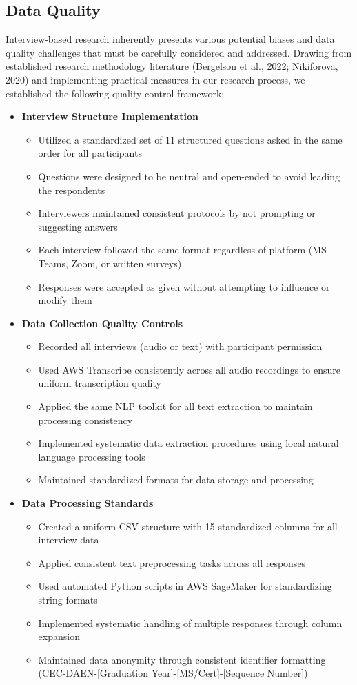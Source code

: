 \documentclass[12pt,a4paper]{article}
\begin{document}
\subsection{Data Quality}
Interview-based research inherently presents various potential biases and data quality challenges that must be carefully considered and addressed. Drawing from established research methodology literature (Bergelson et al., 2022; Nikiforova, 2020) and implementing practical measures in our research process, we established the following quality control framework:
\begin{itemize}
\item \textbf{Interview Structure Implementation}
\begin{itemize}
\item Utilized a standardized set of 11 structured questions asked in the same order for all participants
\item Questions were designed to be neutral and open-ended to avoid leading the respondents
\item Interviewers maintained consistent protocols by not prompting or suggesting answers
\item Each interview followed the same format regardless of platform (MS Teams, Zoom, or written surveys)
\item Responses were accepted as given without attempting to influence or modify them
\end{itemize}
\item \textbf{Data Collection Quality Controls}
\begin{itemize}
\item Recorded all interviews (audio or text) with participant permission
\item Used AWS Transcribe consistently across all audio recordings to ensure uniform transcription quality
\item Applied the same NLP toolkit for all text extraction to maintain processing consistency
\item Implemented systematic data extraction procedures using local natural language processing tools
\item Maintained standardized formats for data storage and processing
\end{itemize}

\item \textbf{Data Processing Standards}
\begin{itemize}
\item Created a uniform CSV structure with 15 standardized columns for all interview data
\item Applied consistent text preprocessing tasks across all responses
\item Used automated Python scripts in AWS SageMaker for standardizing string formats
\item Implemented systematic handling of multiple responses through column expansion
\item Maintained data anonymity through consistent identifier formatting (CEC-DAEN-[Graduation Year]-[MS/Cert]-[Sequence Number])
\end{itemize}


\end{itemize}
\end{document}
